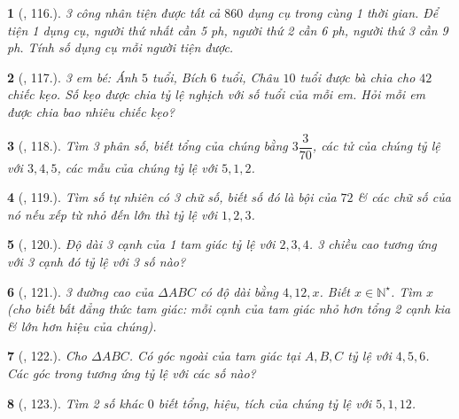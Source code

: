 \documentclass{article}
\newtheorem{baitoan}{}
\begin{document}
\begin{baitoan}[\cite{Binh_Toan_7_tap_1}, 116.]
	3 công nhân tiện được tất cả $860$ dụng cụ trong cùng 1 thời gian. Để tiện 1 dụng cụ, người thứ nhất cần {\rm5 ph}, người thứ 2 cần {\rm6 ph}, người thứ 3 cần {\rm9 ph}. Tính số dụng cụ mỗi người tiện được.
\end{baitoan}

\begin{baitoan}[\cite{Binh_Toan_7_tap_1}, 117.]
	3 em bé: Ánh $5$ tuổi, Bích $6$ tuổi, Châu $10$ tuổi được bà chia cho $42$ chiếc kẹo. Số kẹo được chia tỷ lệ nghịch với số tuổi của mỗi em. Hỏi mỗi em được chia bao nhiêu chiếc kẹo?
\end{baitoan}

\begin{baitoan}[\cite{Binh_Toan_7_tap_1}, 118.]
	Tìm 3 phân số, biết tổng của chúng bằng $3\dfrac{3}{70}$, các tử của chúng tỷ lệ với $3,4,5$, các mẫu của chúng tỷ lệ với $5,1,2$.
\end{baitoan}

\begin{baitoan}[\cite{Binh_Toan_7_tap_1}, 119.]
	Tìm số tự nhiên có 3 chữ số, biết số đó là bội của $72$ \& các chữ số của nó nếu xếp từ nhỏ đến lớn thì tỷ lệ với $1,2,3$.
\end{baitoan}

\begin{baitoan}[\cite{Binh_Toan_7_tap_1}, 120.]
	Độ dài 3 cạnh của 1 tam giác tỷ lệ với $2,3,4$. 3 chiều cao tương ứng với 3 cạnh đó tỷ lệ với 3 số nào?
\end{baitoan}

\begin{baitoan}[\cite{Binh_Toan_7_tap_1}, 121.]
	3 đường cao của $\Delta ABC$ có độ dài bằng $4,12,x$. Biết $x\in\mathbb{N}^\star$. Tìm $x$ (cho biết {\rm bất đẳng thức tam giác}: mỗi cạnh của tam giác nhỏ hơn tổng 2 cạnh kia \& lớn hơn hiệu của chúng).
\end{baitoan}

\begin{baitoan}[\cite{Binh_Toan_7_tap_1}, 122.]
	Cho $\Delta ABC$. Có góc ngoài của tam giác tại $A,B,C$ tỷ lệ với $4,5,6$. Các góc trong tương ứng tỷ lệ với các số nào?
\end{baitoan}

\begin{baitoan}[\cite{Binh_Toan_7_tap_1}, 123.]
	Tìm 2 số khác $0$ biết tổng, hiệu, tích của chúng tỷ lệ với $5,1,12$.
\end{baitoan}
\end{document}
